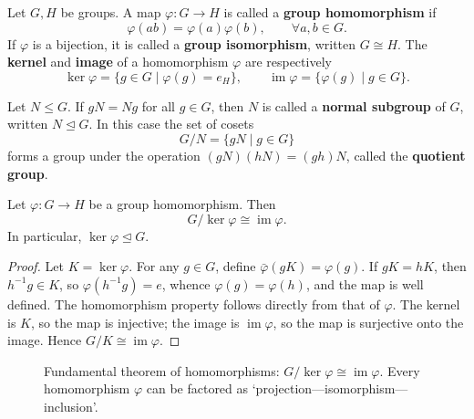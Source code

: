 \begin{definition}\label{def:homomorphism}
Let $G,H$ be groups. A map $\varphi:G\to H$ is called a \textbf{group homomorphism} if
\[
\varphi(ab)=\varphi(a)\varphi(b),\qquad \forall a,b\in G.
\]
If $\varphi$ is a bijection, it is called a \textbf{group isomorphism}, written $G\cong H$. The \textbf{kernel} and \textbf{image} of a homomorphism $\varphi$ are respectively
\[
\ker\varphi=\{g\in G\mid \varphi(g)=e_H\},\qquad
\operatorname{im}\varphi=\{\varphi(g)\mid g\in G\}.
\]
\end{definition}

\begin{definition}\label{def:normal_subgroup}
Let $N\le G$. If $gN=Ng$ for all $g\in G$, then $N$ is called a \textbf{normal subgroup} of $G$, written $N\trianglelefteq G$. In this case the set of cosets
\[
G/N=\{gN\mid g\in G\}
\]
forms a group under the operation $(gN)(hN)=(gh)N$, called the \textbf{quotient group}.
\end{definition}

\begin{theorem}\label{thm:first_isomorphism}
Let $\varphi:G\to H$ be a group homomorphism. Then
\[
G/\ker\varphi\cong \operatorname{im}\varphi.
\]
In particular, $\ker\varphi\trianglelefteq G$.
\end{theorem}

\begin{proof}
Let $K=\ker\varphi$. For any $g\in G$, define $\bar\varphi(gK)=\varphi(g)$. If $gK=hK$, then $h^{-1}g\in K$, so $\varphi(h^{-1}g)=e$, whence $\varphi(g)=\varphi(h)$, and the map is well defined. The homomorphism property follows directly from that of $\varphi$. The kernel is $K$, so the map is injective; the image is $\operatorname{im}\varphi$, so the map is surjective onto the image. Hence $G/K\cong \operatorname{im}\varphi$.
\end{proof}

\begin{figure}[htbp]
\centering
{}
\caption{Fundamental theorem of homomorphisms: $G/\ker\varphi\cong\operatorname{im}\varphi$. Every homomorphism $\varphi$ can be factored as `projection---isomorphism---inclusion'.}
\label{fig:first_isomorphism}
\end{figure}

